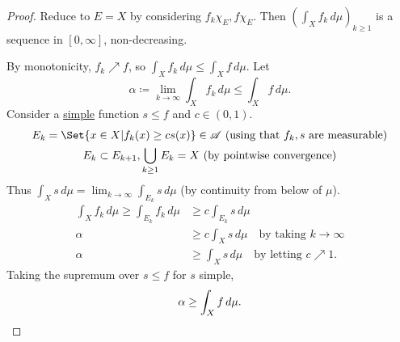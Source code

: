\documentclass[twoside]{article}
\begin{document}
\begin{proof}
    Reduce to $E = X$ by considering $f_k \chi_E, f \chi_E$.
    Then $\left(\int_X f_k \, d\mu\right)_{k \geq 1}$ is a sequence in $[0, \infty]$, non-decreasing.

    By monotonicity, $f_k \nearrow f$, so $\int_X f_k \, d\mu \leq \int_X f \, d\mu$.
    Let
    \begin{equation*}
        \alpha \coloneqq \lim_{k \to \infty} \int_X f_k \, d\mu \leq \int_X f \, d\mu.
    \end{equation*}
    Consider a \hyperlink{def:simple}{simple} function $s \leq f$ and $c \in (0, 1)$.
    \begin{gather*}
        E_k = \Set{x\in X | f_k(x) \geq c s(x)} \in \mathscr{A} \text{ (using that $f_k, s$ are measurable)}\\
        E_k \subset E_{k+1}, \bigcup_{k \geq 1} E_k = X \text{ (by pointwise convergence)}
    \end{gather*}
    Thus $\int_X s \, d\mu = \lim_{k \to \infty} \int_{E_k} s \, d\mu$ (by continuity from below of $\mu$).
    \begin{align*}
        \int_X f_k \, d\mu \geq \int_{E_k} f_k \, d \mu &\geq c \int_{E_k} s \, d \mu \\
        \alpha &\geq c \int_X s \, d \mu \quad \text{by taking } k \to \infty \\
        \alpha &\geq \int_X s \, d \mu \quad \text{by letting } c \nearrow 1.
    \end{align*}
    Taking the supremum over $s \leq f$ for $s$ simple,
    \begin{equation*}
        \alpha \geq \int_X f \, d\mu.\qedhere
    \end{equation*}
\end{proof}
\end{document}
